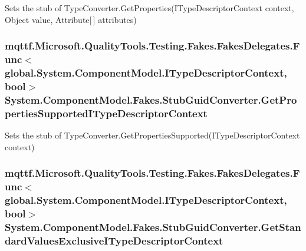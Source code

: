 Sets the stub of Type\-Converter.\-Get\-Properties(\-I\-Type\-Descriptor\-Context context, Object value, Attribute\mbox{[}$\,$\mbox{]} attributes)

\hypertarget{class_system_1_1_component_model_1_1_fakes_1_1_stub_guid_converter_a0060814506353b359803a3d7a9e51546}{
\subsubsection[{Get\-Properties\-Supported\-I\-Type\-Descriptor\-Context}]{\setlength{\rightskip}{0pt plus 5cm}mqttf.\-Microsoft.\-Quality\-Tools.\-Testing.\-Fakes.\-Fakes\-Delegates.\-Func$<$global.\-System.\-Component\-Model.\-I\-Type\-Descriptor\-Context, bool$>$ System.\-Component\-Model.\-Fakes.\-Stub\-Guid\-Converter.\-Get\-Properties\-Supported\-I\-Type\-Descriptor\-Context}}\label{class_system_1_1_component_model_1_1_fakes_1_1_stub_guid_converter_a0060814506353b359803a3d7a9e51546}


Sets the stub of Type\-Converter.\-Get\-Properties\-Supported(\-I\-Type\-Descriptor\-Context context)

\hypertarget{class_system_1_1_component_model_1_1_fakes_1_1_stub_guid_converter_a5dcf48aeac4743cab1e3954ad2ed6289}{
\subsubsection[{Get\-Standard\-Values\-Exclusive\-I\-Type\-Descriptor\-Context}]{\setlength{\rightskip}{0pt plus 5cm}mqttf.\-Microsoft.\-Quality\-Tools.\-Testing.\-Fakes.\-Fakes\-Delegates.\-Func$<$global.\-System.\-Component\-Model.\-I\-Type\-Descriptor\-Context, bool$>$ System.\-Component\-Model.\-Fakes.\-Stub\-Guid\-Converter.\-Get\-Standard\-Values\-Exclusive\-I\-Type\-Descriptor\-Context}}\label{class_system_1_1_component_model_1_1_fakes_1_1_stub_guid_converter_a5dcf48aeac4743cab1e3954ad2ed6289}


